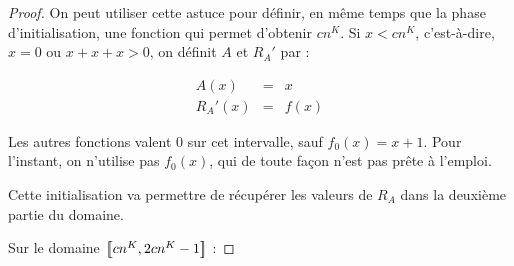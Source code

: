 \begin{appendices}
\begin{proof}
			On peut utiliser cette astuce pour définir, en même temps que la phase d'initialisation, une fonction qui permet d'obtenir $cn^K$. Si $x<cn^K$, c'est-à-dire, $x=0$ ou $x + x + x >0$, on définit $A$ et $R_A'$ par :
			
			
			
			
	 
			\begin{eqnarray}
			A(x) & = & x \\
			R_A'(x) & = & f(x)
			\end{eqnarray}
			
			Les autres fonctions valent $0$ sur cet intervalle, sauf $f_0(x) = x+1$. Pour l'instant, on n'utilise pas $f_0(x)$, qui de toute façon n'est pas prête à l'emploi.
			
			Cette initialisation va permettre de récupérer les valeurs de $R_A$ dans la deuxième partie du domaine. 
			
			\espace
			
			Sur le domaine $\left[\,\!\!\!\left[ cn^K , 2cn^K-1 \right]\,\!\!\!\right]$ : 
			
			\espace 
			
\end{proof}
\end{appendices}
